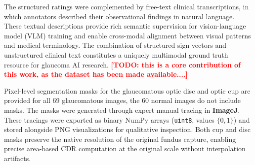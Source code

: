 \documentclass[runningheads]{llncs}
\newcommand{\todo}[1]{\textcolor{red}{\textbf{[TODO: #1]}}}
\begin{document}

The structured ratings were complemented by free-text clinical transcriptions, in which annotators described their observational findings in natural language. These textual descriptions provide rich semantic supervision for vision-language model (VLM) training and enable cross-modal alignment between visual patterns and medical terminology. The combination of structured sign vectors and unstructured clinical text constitutes a uniquely multimodal ground truth resource for glaucoma AI research. \todo{this is a core contribution of this work, as the dataset has been made available....}



Pixel-level segmentation masks for the glaucomatous optic disc and optic cup are provided for all 69 glaucomatous images, the 60 normal images do not include masks. The masks were generated through expert manual tracing in \textbf{ImageJ}. These tracings were exported as binary NumPy arrays (\texttt{uint8}, values $\{0, 1\}$) and stored alongside PNG visualizations for qualitative inspection. Both cup and disc masks preserve the native resolution of the original fundus capture, enabling precise area-based CDR computation at the original scale without interpolation artifacts.

\end{document}
